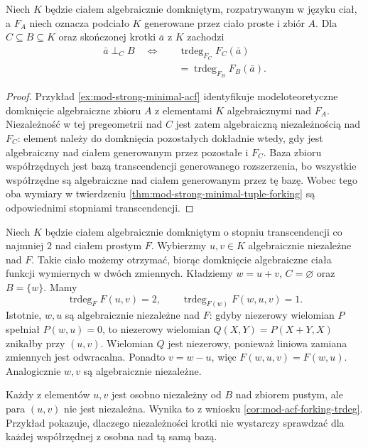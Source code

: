 \begin{wniosek}
\label{cor:mod-acf-forking-trdeg}
Niech $K$ będzie ciałem algebraicznie
domkniętym, rozpatrywanym w języku ciał,
a $F_A$ niech oznacza podciało $K$
generowane przez ciało proste i zbiór $A$.
Dla $C\subseteq B\subseteq K$ oraz skończonej
krotki $\bar a$ z $K$ zachodzi
\[
\begin{aligned}
\bar a\mathrel{\perp_C}B
\quad\Longleftrightarrow\quad&
\operatorname{trdeg}_{F_C}F_C(\bar a)\\
&=\operatorname{trdeg}_{F_B}F_B(\bar a).
\end{aligned}
\]
\end{wniosek}
\begin{proof}
Przykład \ref{ex:mod-strong-minimal-acf}
identyfikuje modeloteoretyczne domknięcie
algebraiczne zbioru $A$ z elementami $K$
algebraicznymi nad $F_A$.
Niezależność w tej pregeometrii nad $C$
jest zatem algebraiczną niezależnością
nad $F_C$: element należy do domknięcia
pozostałych dokładnie wtedy, gdy jest
algebraiczny nad ciałem generowanym przez
pozostałe i $F_C$.
Baza zbioru współrzędnych jest bazą
transcendencji generowanego rozszerzenia,
bo wszystkie współrzędne są algebraiczne
nad ciałem generowanym przez tę bazę.
Wobec tego oba wymiary w twierdzeniu
\ref{thm:mod-strong-minimal-tuple-forking}
są odpowiednimi stopniami transcendencji.
\end{proof}

\begin{przyklad}
\label{ex:mod-acf-forking-dimension-drop}
Niech $K$ będzie ciałem algebraicznie domkniętym
o stopniu transcendencji co najmniej $2$ nad
ciałem prostym $F$. Wybierzmy $u,v\in K$
algebraicznie niezależne nad $F$. Takie ciało
możemy otrzymać, biorąc domknięcie algebraiczne
ciała funkcji wymiernych w dwóch zmiennych.
Kładziemy $w=u+v$, $C=\varnothing$ oraz $B=\{w\}$.
Mamy
\[
\operatorname{trdeg}_{F}F(u,v)=2,
\qquad
\operatorname{trdeg}_{F(w)}F(w,u,v)=1.
\]
Istotnie, $w,u$ są algebraicznie niezależne
nad $F$: gdyby niezerowy wielomian $P$
spełniał $P(w,u)=0$, to niezerowy wielomian
$Q(X,Y)=P(X+Y,X)$ znikałby przy $(u,v)$.
Wielomian $Q$ jest niezerowy, ponieważ
liniowa zamiana zmiennych jest odwracalna.
Ponadto $v=w-u$, więc $F(w,u,v)=F(w,u)$.
Analogicznie $w,v$ są algebraicznie niezależne.

Każdy z elementów $u,v$ jest osobno
niezależny od $B$ nad zbiorem pustym,
ale para $(u,v)$ nie jest niezależna.
Wynika to z wniosku
\ref{cor:mod-acf-forking-trdeg}.
Przykład pokazuje, dlaczego niezależności
krotki nie wystarczy sprawdzać dla
każdej współrzędnej z osobna nad tą samą bazą.
\end{przyklad}


